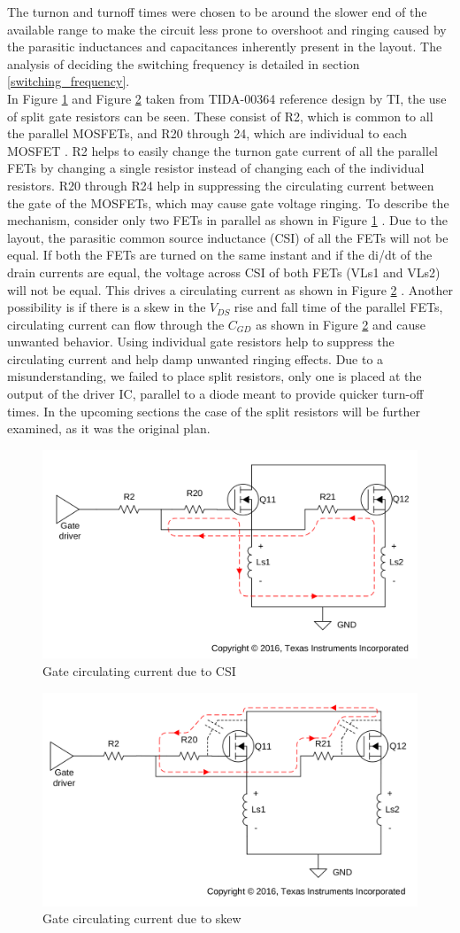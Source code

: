 The turnon and turnoff times were chosen to be around the slower end of the available range to make the circuit less prone to overshoot and ringing caused by the parasitic inductances and capacitances inherently present in the layout. The analysis of deciding the switching frequency is detailed in section \ref{switching_frequency}. \\

In Figure \ref{fig:CSI_current} and Figure \ref{fig:skew_current} taken from TIDA-00364\cite{TIDA-00364} reference design by TI, the use of split gate resistors can be seen. These consist of R2, which is common to all the parallel MOSFETs, and R20 through 24, which are individual to each MOSFET . R2 helps to easily change the turnon gate current of all the parallel FETs by changing a single resistor instead of changing each of the individual resistors. R20 through R24 help in suppressing the circulating current between the gate of the MOSFETs, which may cause gate voltage ringing. To describe the mechanism, consider only two FETs in parallel as shown in Figure \ref{fig:CSI_current} . Due to the layout, the parasitic common source inductance (CSI) of all the FETs will not be equal. If both the FETs are turned on the same instant and if the di/dt of the drain currents are equal, the voltage across CSI of both FETs (VLs1 and VLs2) will not be equal. This drives a circulating current as shown in Figure \ref{fig:skew_current} . Another possibility is if there is a skew in the $V_{DS}$ rise and fall time of the parallel FETs, circulating current can flow through the $C_{GD}$ as shown in Figure \ref{fig:skew_current} and cause unwanted behavior. Using individual gate resistors help to suppress the circulating current and help damp unwanted ringing effects. Due to a misunderstanding, we failed to place split resistors, only one is placed at the output of the driver IC, parallel to a diode meant to provide quicker turn-off times. In the upcoming sections the case of the split resistors will be further examined, as it was the original plan.

\begin{figure}[H]
	\centering
	\includegraphics[width=0.6\linewidth]{pictures/hardware/Driver_Board/CSI.png}
	\caption{Gate circulating current due to CSI}
	\label{fig:CSI_current}
\end{figure}

\begin{figure}[H]
	\centering
	\includegraphics[width=0.6\linewidth]{pictures/hardware/Driver_Board/skew.png}
	\caption{Gate circulating current due to skew}
	\label{fig:skew_current}
\end{figure}